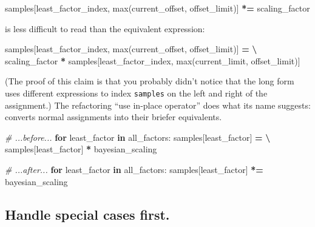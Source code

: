 \documentclass[
]{krantz}
\makeatletter
\newenvironment{Shaded}{\begin{snugshade}}{\end{snugshade}}
\newcommand{\BuiltInTok}[1]{#1}
\newcommand{\CommentTok}[1]{\textcolor[rgb]{0.56,0.35,0.01}{\textit{#1}}}
\newcommand{\ControlFlowTok}[1]{\textcolor[rgb]{0.13,0.29,0.53}{\textbf{#1}}}
\newcommand{\KeywordTok}[1]{\textcolor[rgb]{0.13,0.29,0.53}{\textbf{#1}}}
\newcommand{\NormalTok}[1]{#1}
\newcommand{\OperatorTok}[1]{\textcolor[rgb]{0.81,0.36,0.00}{\textbf{#1}}}
\newenvironment{kframe}{%
\medskip{}
\setlength{\fboxsep}{.8em}
 \def\at@end@of@kframe{}%
 \ifinner\ifhmode%
  \def\at@end@of@kframe{\end{minipage}}%
  \begin{minipage}{\columnwidth}%
 \fi\fi%
 \def\FrameCommand##1{\hskip\@totalleftmargin \hskip-\fboxsep
 \colorbox{shadecolor}{##1}\hskip-\fboxsep
     \hskip-\linewidth \hskip-\@totalleftmargin \hskip\columnwidth}%
 \MakeFramed {\advance\hsize-\width
   \@totalleftmargin\z@ \linewidth\hsize
   \@setminipage}}%
 {\par\unskip\endMakeFramed%
 \at@end@of@kframe}
\renewenvironment{Shaded}{\begin{kframe}}{\end{kframe}}
\makeatother
\begin{document}
\begin{Shaded}
\begin{Highlighting}[]
\NormalTok{samples[least\_factor\_index, }\BuiltInTok{max}\NormalTok{(current\_offset, offset\_limit)] }\OperatorTok{*=}\NormalTok{ scaling\_factor}
\end{Highlighting}
\end{Shaded}

is less difficult to read than the equivalent expression:

\begin{Shaded}
\begin{Highlighting}[]
\NormalTok{samples[least\_factor\_index, }\BuiltInTok{max}\NormalTok{(current\_offset, offset\_limit)] }\OperatorTok{=} \OperatorTok{\textbackslash{}}
\NormalTok{    scaling\_factor }\OperatorTok{*}\NormalTok{ samples[least\_factor\_index, }\BuiltInTok{max}\NormalTok{(current\_limit, offset\_limit)]}
\end{Highlighting}
\end{Shaded}

(The proof of this claim is that you probably didn't notice
that the long form uses different expressions to index \texttt{samples}
on the left and right of the assignment.)
The refactoring ``use in-place operator'' does what its name suggests:
converts normal assignments into their briefer equivalents.

\begin{Shaded}
\begin{Highlighting}[]
\CommentTok{\# ...before...}
\ControlFlowTok{for}\NormalTok{ least\_factor }\KeywordTok{in}\NormalTok{ all\_factors:}
\NormalTok{    samples[least\_factor] }\OperatorTok{=} \OperatorTok{\textbackslash{}}
\NormalTok{        samples[least\_factor] }\OperatorTok{*}\NormalTok{ bayesian\_scaling}
\end{Highlighting}
\end{Shaded}

\begin{Shaded}
\begin{Highlighting}[]
\CommentTok{\# ...after...}
\ControlFlowTok{for}\NormalTok{ least\_factor }\KeywordTok{in}\NormalTok{ all\_factors:}
\NormalTok{    samples[least\_factor] }\OperatorTok{*=}\NormalTok{ bayesian\_scaling}
\end{Highlighting}
\end{Shaded}

\hypertarget{handle-special-cases-first.}{%
\subsection{Handle special cases first.}\label{handle-special-cases-first.}}
\end{document}
